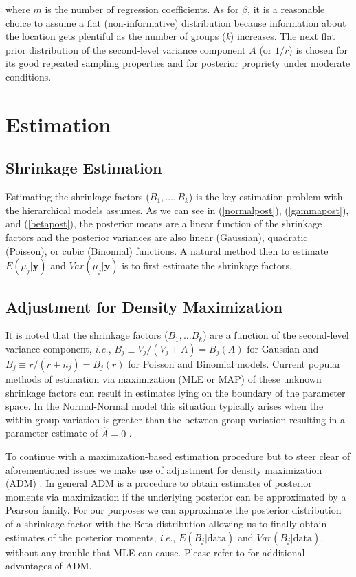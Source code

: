 \documentclass[article]{jss}
\begin{document}
where $m$ is the number of regression coefficients. As for $\beta$, it is a reasonable choice to assume a flat (non-informative) distribution because information about the location gets plentiful as the number of groups (\emph{k}) increases. The next flat prior distribution of the second-level variance component $A$ (or $1/r$) is chosen for its good repeated sampling properties and for posterior propriety under moderate conditions.


\section[Estimation]{Estimation}

\subsection[Shrinkage Estimation]{Shrinkage Estimation}
Estimating the shrinkage factors ($B_1, \ldots, B_k$) is the key estimation problem with the hierarchical models  assumes. As we can see in (\ref{normalpost}), (\ref{gammapost}), and (\ref{betapost}), the posterior means are a linear function of the shrinkage factors and the posterior variances are also linear (Gaussian), quadratic (Poisson), or cubic (Binomial) functions. A natural method then to estimate $E(\mu_{j}\vert \textbf{y})$ and $Var(\mu_{j}\vert \textbf{y})$ is to first estimate the shrinkage factors.

\subsection[ADM]{Adjustment for Density Maximization}
It is noted that the shrinkage factors ($B_1, \ldots B_k$) are a function of the second-level variance component, \emph{i.e.}, $B_{j}\equiv V_{j}/(V_{j}+A)=B_{j}(A)$ for Gaussian and $B_{j}\equiv r/(r+n_{j})=B_{j}(r)$ for Poisson and Binomial models. Current popular methods of estimation via maximization (MLE or MAP) of these unknown shrinkage factors can result in estimates lying on the boundary of the parameter space. In the Normal-Normal model this situation typically arises when the within-group variation is greater than the between-group variation resulting in a parameter estimate of $\hat{A} = 0$ \citep{2012}.

To continue with a maximization-based estimation procedure but to steer clear of aforementioned issues we make use of adjustment for density maximization (ADM) \citep{2011}. In general ADM is a procedure to obtain estimates of posterior moments via maximization if the underlying posterior can be approximated by a Pearson family. For our purposes we can approximate the posterior distribution of a shrinkage factor with the Beta distribution allowing us to finally obtain estimates of the posterior moments, \emph{i.e.}, $E(B_{j}\vert\textrm{data})$ and $Var(B_{j}\vert\textrm{data})$, without any trouble that MLE can cause. Please refer to \cite{2011} for additional advantages of ADM.
\end{document}
